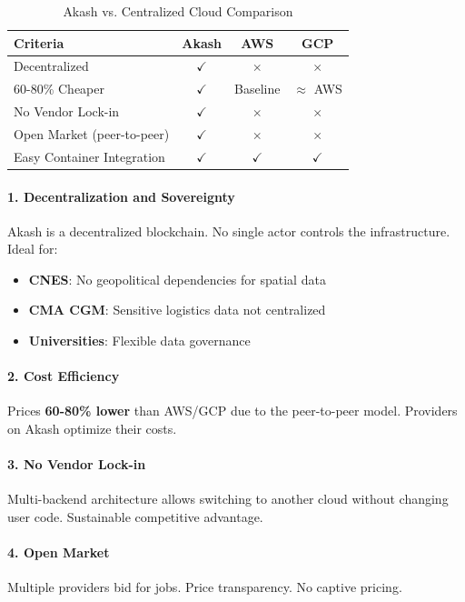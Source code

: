 \documentclass[11pt,a4paper]{article}
\begin{document}
	\begin{table}[H]
		\centering
		\small
		\begin{tabularx}{\linewidth}{l | c | c | c}
			\toprule
			\textbf{Criteria} & \textbf{Akash} & \textbf{AWS} & \textbf{GCP} \\
			\midrule
			Decentralized & $\checkmark$ & $\times$ & $\times$ \\
			60-80\% Cheaper & $\checkmark$ & Baseline & $\approx$ AWS \\
			No Vendor Lock-in & $\checkmark$ & $\times$ & $\times$ \\
			Open Market (peer-to-peer) & $\checkmark$ & $\times$ & $\times$ \\
			Easy Container Integration & $\checkmark$ & $\checkmark$ & $\checkmark$ \\
			\bottomrule
		\end{tabularx}
		\caption{Akash vs. Centralized Cloud Comparison}
	\end{table}
	
	\paragraph{1. Decentralization and Sovereignty}
	Akash is a decentralized blockchain. No single actor controls the infrastructure. Ideal for:
	\begin{itemize}
		\item \textbf{CNES}: No geopolitical dependencies for spatial data
		\item \textbf{CMA CGM}: Sensitive logistics data not centralized
		\item \textbf{Universities}: Flexible data governance
	\end{itemize}
	
	\paragraph{2. Cost Efficiency}
	Prices \textbf{60-80\% lower} than AWS/GCP due to the peer-to-peer model. Providers on Akash optimize their costs.
	
	\paragraph{3. No Vendor Lock-in}
	Multi-backend architecture allows switching to another cloud without changing user code. Sustainable competitive advantage.
	
	\paragraph{4. Open Market}
	Multiple providers bid for jobs. Price transparency. No captive pricing.
	
\end{document}
